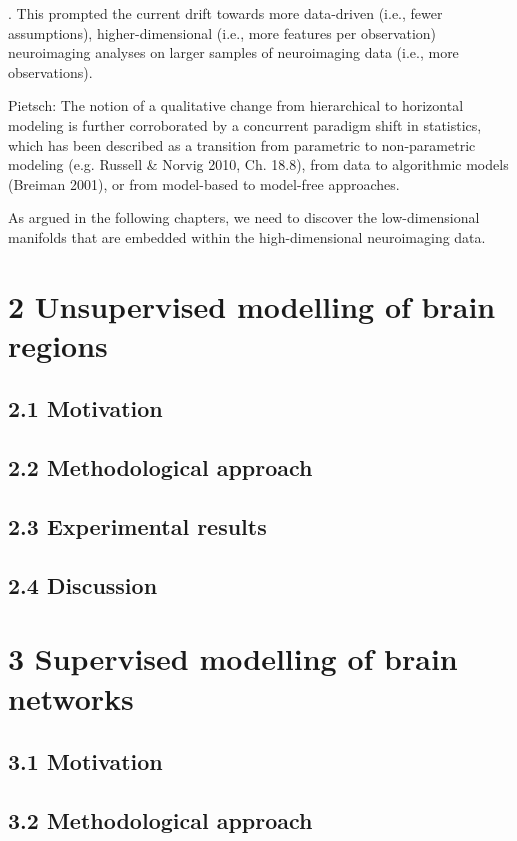 \documentclass[authoryear,review,3p]{elsarticle}
\begin{document}
. This prompted the current drift towards more data-driven (i.e., fewer assumptions), higher-dimensional (i.e., more features per observation) neuroimaging analyses on larger samples of neuroimaging data (i.e., more observations).


Pietsch:
The notion of a qualitative change from hierarchical to horizontal modeling is further corroborated by a concurrent paradigm shift in statistics, which has been described as a transition from parametric to non-parametric modeling (e.g. Russell \& Norvig 2010, Ch. 18.8), from data to algorithmic models (Breiman 2001), or from model-based to model-free approaches.


As argued in the following chapters,
we need to discover
the low-dimensional manifolds that are
embedded within the high-dimensional neuroimaging data.



\section*{2 Unsupervised modelling of brain regions}

\subsection*{2.1 Motivation}
\subsection*{2.2 Methodological approach}
\subsection*{2.3 Experimental results}
\subsection*{2.4 Discussion}



\section*{3 Supervised modelling of brain networks}

\subsection*{3.1 Motivation}
\subsection*{3.2 Methodological approach}
\end{document}
